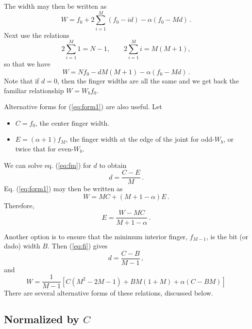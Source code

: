 \documentclass[12pt,final]{article}
\begin{document}
The width may then be written as
\begin{equation}
  W = f_0 + 2 \sum_{i = 1}^{M} (f_0 - i d) - \alpha (f_0 - M d)\,.
\end{equation}
Next use the relations
\begin{equation}
   2 \sum_{i = 1}^{M} 1 = N - 1, \qquad
   2 \sum_{i = 1}^{M} i = M (M+1),
\end{equation}
so that we have
\begin{equation}
 \label{eq:form1}
  W = N f_0 - d M (M+1) - \alpha (f_0 - M d)\,.
\end{equation}
Note that if $d = 0$, then the finger widths are all the same and we
get back the familiar relationship $W = W_b f_0$.

Alternative forms for (\ref{eq:form1}) are also useful.  Let
\begin{itemize}
\item $C = f_0$, the center finger width.
\item $E = (\alpha + 1) f_M$, the finger width at the edge of the joint for
  odd-$W_b$, or twice that for even-$W_b$.
\end{itemize}
We can solve eq. (\ref{eq:fm}) for $d$ to obtain
\begin{equation}
  d = \frac{C - E}{M}\,.
\end{equation}
Eq. (\ref{eq:form1}) may then be written as
\begin{equation}
  \label{eq:dimformE}
  W = M C + (M + 1 - \alpha) E\,.
\end{equation}
Therefore,
\begin{equation}
  \label{eq:dimE}
  E = \frac{W - M C}{M + 1 - \alpha}\,.
\end{equation}

Another option is to ensure that the minimum interior finger, $f_{M-1}$, is
the bit (or dado) width $B$.  Then (\ref{eq:fi}) gives
\begin{equation}
  d = \frac{C - B}{M-1}\,,
\end{equation}
and
\begin{equation}
  \label{eq:dimformB}
  W = \frac{1}{M-1} \left[C(M^2 - 2 M -1) + B M (1+M) + \alpha (C - B M)\right]
\end{equation}
There are several alternative forms of these relations, discussed below.

\subsection{Normalized by $C$}
\end{document}
